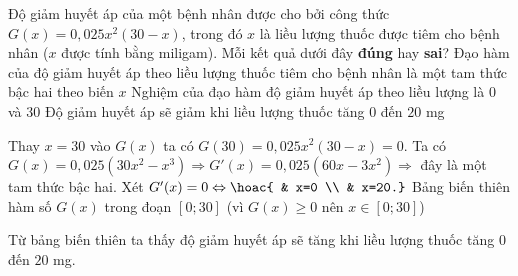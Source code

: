 \begin{ex}%
%
	Độ giảm huyết áp của một bệnh nhân được cho bởi công thức $G(x)=0{,}025x^2(30-x)$, trong đó $x$ là liều lượng thuốc được tiêm cho bệnh nhân ($x$ được tính bằng miligam). Mỗi kết quả dưới đây \textbf{đúng} hay \textbf{sai}?
	{\True Đạo hàm của độ giảm huyết áp theo liều lượng thuốc tiêm cho bệnh nhân là một tam thức bậc hai theo biến $x$}
	{Nghiệm của đạo hàm độ giảm huyết áp theo liều lượng là $0$ và $30$}
	{Độ giảm huyết áp sẽ giảm khi liều lượng thuốc tăng $0$ đến $20$ mg}
	\loigiai
	{ 
		\begin{itemchoice}
			\itemch Thay $x=30$ vào $G(x)$ ta có $G(30)=0{,}025x^2(30-x)=0$.
			\itemch Ta có $G(x)=0{,}025\left(30x^2-x^3\right) \Rightarrow G'(x)=0{,}025\left(60x-3x^2\right) \Rightarrow$ đây là một tam thức bậc hai.
			\itemch Xét $G'(x)=0 \Leftrightarrow \hoac{ & x=0 \\ & x=20.}$ 
			\itemch Bảng biến thiên hàm số $G(x)$ trong đoạn $[0;30]$ (vì $G(x)\ge 0$ nên $x\in [0;30]$)
			\begin{center}
			\end{center}
			Từ bảng biến thiên ta thấy độ giảm huyết áp sẽ tăng khi liều lượng thuốc tăng $0$ đến $20$ mg.
		\end{itemchoice}
	}
\end{ex}

